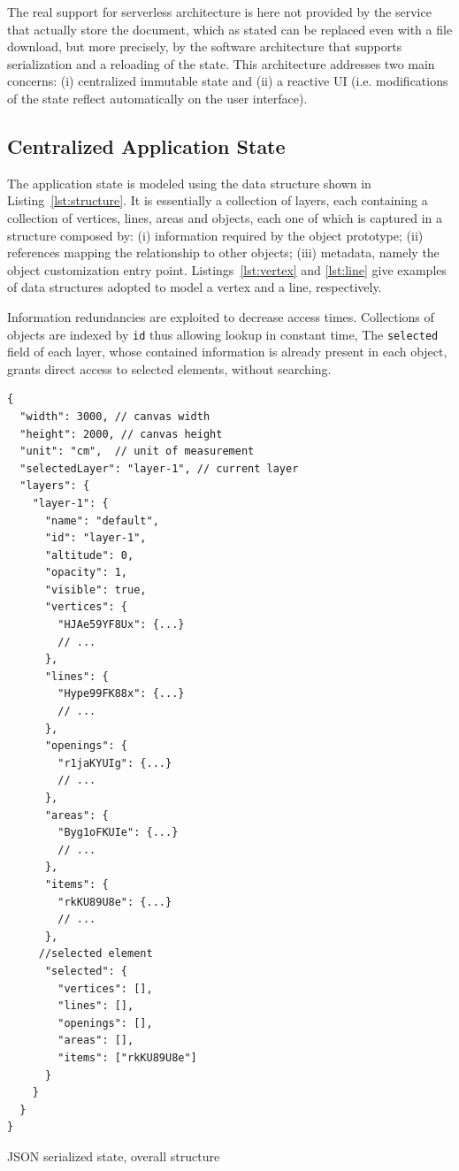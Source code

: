 The real support for serverless architecture is here not provided by the service that actually store the document, which as stated can be replaced even with a file download, but more precisely, by the software architecture that supports serialization and a reloading of the state. This architecture addresses two main concerns: (i) centralized immutable state and (ii) a reactive UI (i.e. modifications of the state reflect automatically on the user interface).

\subsection{Centralized Application State}\label{ssub:centr_state}

The application state is modeled using the data structure shown in Listing~\ref{lst:structure}. It is essentially a collection of layers, each containing a collection of vertices, lines, areas and objects, each one of which is captured in a structure composed by: (i) information required by the object prototype; (ii) references mapping the relationship to other objects; (iii) metadata, namely the object customization entry point. Listings~\ref{lst:vertex} and \ref{lst:line} give examples of data structures adopted to model a vertex and a line, respectively. 

Information redundancies are exploited to decrease access times. Collections of objects are indexed by \texttt{id} thus allowing lookup in constant time, The \texttt{selected} field of each layer, whose contained information is already present in each object,  grants direct access to selected elements, without searching.

\begin{listing}
\begin{verbatim}
{
  "width": 3000, // canvas width
  "height": 2000, // canvas height
  "unit": "cm",  // unit of measurement
  "selectedLayer": "layer-1", // current layer
  "layers": {
    "layer-1": {
      "name": "default",
      "id": "layer-1",
      "altitude": 0,
      "opacity": 1,
      "visible": true,
      "vertices": {
        "HJAe59YF8Ux": {...}
        // ...
      },
      "lines": {
        "Hype99FK88x": {...}
        // ...
      },
      "openings": {
        "r1jaKYUIg": {...}
        // ...
      },
      "areas": {
        "Byg1oFKUIe": {...}
        // ...
      },
      "items": {
        "rkKU89U8e": {...}
        // ...
      },
     //selected element
      "selected": {
        "vertices": [],
        "lines": [],
        "openings": [],
        "areas": [],
        "items": ["rkKU89U8e"]
      }
    }
  }
}
\end{verbatim}
\caption{JSON serialized state, overall structure} 
\label{lst:structure}
\end{listing}

